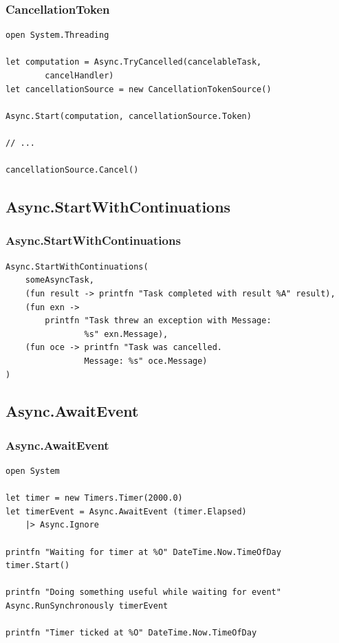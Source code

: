\documentclass[xetex,mathserif,serif]{beamer}
\begin{document}
    \begin{frame}[fragile]
        \frametitle{CancellationToken}
        \begin{verbatim}
open System.Threading

let computation = Async.TryCancelled(cancelableTask, 
        cancelHandler)
let cancellationSource = new CancellationTokenSource()

Async.Start(computation, cancellationSource.Token)

// ...

cancellationSource.Cancel()
        \end{verbatim}
    \end{frame}

    \subsection{Async.StartWithContinuations}

    \begin{frame}[fragile]
        \frametitle{Async.StartWithContinuations}
        \begin{verbatim}
Async.StartWithContinuations(
    someAsyncTask,
    (fun result -> printfn "Task completed with result %A" result),
    (fun exn -> 
        printfn "Task threw an exception with Message: 
                %s" exn.Message),
    (fun oce -> printfn "Task was cancelled. 
                Message: %s" oce.Message)
)
        \end{verbatim}
    \end{frame}

    \subsection{Async.AwaitEvent}

    \begin{frame}[fragile]
        \frametitle{Async.AwaitEvent}
        \begin{verbatim}
open System

let timer = new Timers.Timer(2000.0)
let timerEvent = Async.AwaitEvent (timer.Elapsed) 
    |> Async.Ignore

printfn "Waiting for timer at %O" DateTime.Now.TimeOfDay
timer.Start()

printfn "Doing something useful while waiting for event"
Async.RunSynchronously timerEvent

printfn "Timer ticked at %O" DateTime.Now.TimeOfDay
        \end{verbatim}
    \end{frame}
\end{document}
